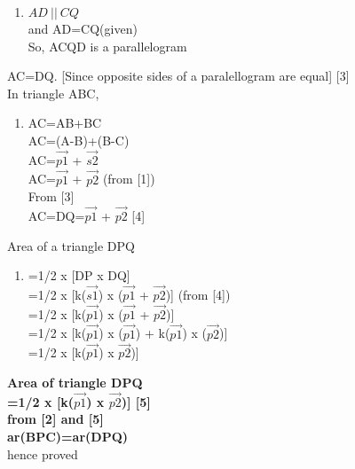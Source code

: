 \documentclass[journal,12pt,twocolumn]{IEEEtran}
\begin{document}
\begin{flushleft}
\begin{enumerate}
\item[]
$ AD \: || \: CQ $\\ and AD=CQ(given)\\ So, ACQD is a parallelogram\\
\end{enumerate}
\vspace{0.1cm}
AC=DQ. [Since opposite sides of a paralellogram are equal]
 \hspace{4.5cm} [3] \\
\vspace{0.1cm}
In triangle ABC,\\ 
\begin{enumerate}
\item[]
AC=AB+BC\\    AC=(A-B)+(B-C)\\    AC=$\vec{p1}$ + $\vec{s2}$\\
 AC=$\vec{p1}$ + $\vec{p2}$ (from [1])\\
 From [3]\\ AC=DQ=$\vec{p1}$ + $\vec{p2}$ \hspace{2.5cm}[4]\\
\end{enumerate} 
Area of a triangle DPQ\\
\begin{enumerate}
\item[]
=1/2 x [DP x DQ]\\
=1/2 x [k($\vec{s1}$) x ($\vec{p1}$ + $\vec{p2}$)] (from [4])\\ 
=1/2 x [k($\vec{p1}$) x ($\vec{p1}$ + $\vec{p2}$)]\\ 
=1/2 x [k($\vec{p1}$) x ($\vec{p1}$) + k($\vec{p1}$) x ($\vec{p2}$)]\\ 
=1/2 x [k($\vec{p1}$) x $\vec{p2}$)]\\
\end{enumerate}
\textbf{Area of triangle DPQ}\\
\vspace{0.1cm}
\textbf{=1/2 x [k($\vec{p1}$) x $\vec{p2}$)]  \hspace{2.5cm} [5]}\\
\vspace{0.1cm}
\textbf{from [2] and [5]}\\
\vspace{0.1cm}
\textbf{ar(BPC)=ar(DPQ)}\\
\vspace{0.1cm}
hence proved\\

\end{flushleft}
\end{document}
